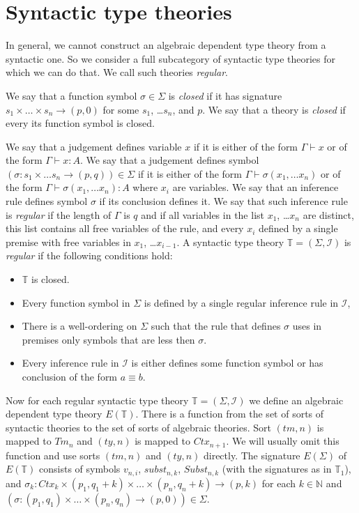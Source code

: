\documentclass[reqno]{amsart}
\theoremstyle{definition}
\theoremstyle{remark}
\newcommand{\deq}{\equiv}
\numberwithin{figure}{section}
\begin{document}

\section{Syntactic type theories}

In general, we cannot construct an algebraic dependent type theory from a syntactic one.
So we consider a full subcategory of syntactic type theories for which we can do that.
We call such theories \emph{regular}.

We say that a function symbol $\sigma \in \Sigma$ is \emph{closed} if it has signature $s_1 \times \ldots \times s_n \to (p,0)$ for some $s_1$, \ldots $s_n$, and $p$.
We say that a theory is \emph{closed} if every its function symbol is closed.

We say that a judgement defines variable $x$ if it is either of the form $\Gamma \vdash x$ or of the form $\Gamma \vdash x : A$.
We say that a judgement defines symbol $(\sigma : s_1 \times \ldots s_n \to (p,q)) \in \Sigma$ if it is either
of the form $\Gamma \vdash \sigma(x_1, \ldots x_n)$ or of the form $\Gamma \vdash \sigma(x_1, \ldots x_n) : A$ where $x_i$ are variables.
We say that an inference rule defines symbol $\sigma$ if its conclusion defines it.
We say that such inference rule is \emph{regular} if the length of $\Gamma$ is $q$ and
if all variables in the list $x_1$, \ldots $x_n$ are distinct, this list contains all free variables of the rule,
and every $x_i$ defined by a single premise with free variables in $x_1$, \ldots $x_{i-1}$.
A syntactic type theory $\mathbb{T} = (\Sigma, \mathcal{I})$ is \emph{regular} if the following conditions hold:
\begin{itemize}
\item $\mathbb{T}$ is closed.
\item Every function symbol in $\Sigma$ is defined by a single regular inference rule in $\mathcal{I}$,
\item There is a well-ordering on $\Sigma$ such that the rule that defines $\sigma$ uses in premises only symbols that are less then $\sigma$.
\item Every inference rule in $\mathcal{I}$ is either defines some function symbol or has conclusion of the form $a \deq b$.
\end{itemize}

Now for each regular syntactic type theory $\mathbb{T} = (\Sigma, \mathcal{I})$ we define an algebraic dependent type theory $E(\mathbb{T})$.
There is a function from the set of sorts of syntactic theories to the set of sorts of algebraic theories.
Sort $(tm,n)$ is mapped to $Tm_n$ and $(ty,n)$ is mapped to $Ctx_{n+1}$.
We will usually omit this function and use sorts $(tm,n)$ and $(ty,n)$ directly.
The signature $E(\Sigma)$ of $E(\mathbb{T})$ consists of symbols $v_{n,i}$, $subst_{n,k}$, $Subst_{n,k}$ (with the signatures as in $\mathbb{T}_1$), and
$\sigma_k : Ctx_k \times (p_1,q_1+k) \times \ldots \times (p_n,q_n+k) \to (p,k)$
for each $k \in \mathbb{N}$ and $(\sigma : (p_1,q_1) \times \ldots \times (p_n,q_n) \to (p,0)) \in \Sigma$.
\end{document}
